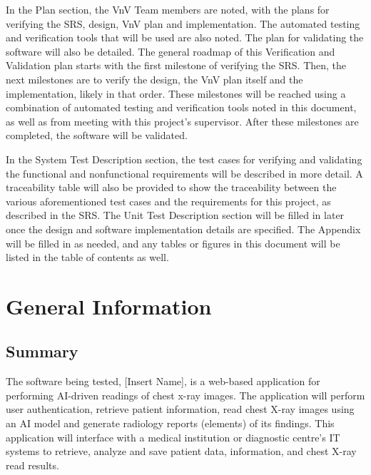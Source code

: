 \documentclass[12pt, titlepage]{article}
\begin{document}
In the Plan section, the VnV Team members are noted, with the plans for verifying the SRS, design, VnV plan and implementation. The automated testing and verification tools that will be used are also noted. The plan for validating the software will also be detailed. The general roadmap of this Verification and Validation plan starts with the first milestone of verifying the SRS. Then, the next milestones are to verify the design, the VnV plan itself and the implementation, likely in that order. These milestones will be reached using a combination of automated testing and verification tools noted in this document, as well as from meeting with this project's supervisor. After these milestones are completed, the software will be validated.

In the System Test Description section, the test cases for verifying and validating the functional and nonfunctional requirements will be described in more detail. A traceability table will also be provided to show the traceability between the various aforementioned test cases and the requirements for this project, as described in the SRS. The Unit Test Description section will be filled in later once the design and software implementation details are specified. The Appendix will be filled in as needed, and any tables or figures in this document will be listed in the table of contents as well.

\section{General Information}

\subsection{Summary}
The software being tested, [Insert Name], is a web-based application for performing AI-driven readings of chest x-ray images. The application will perform user authentication, retrieve patient information, read chest X-ray images using an AI model and generate radiology reports (elements) of its findings. This application will interface with a medical institution or diagnostic centre's IT systems to retrieve, analyze and save patient data, information, and chest X-ray read results.
\end{document}
